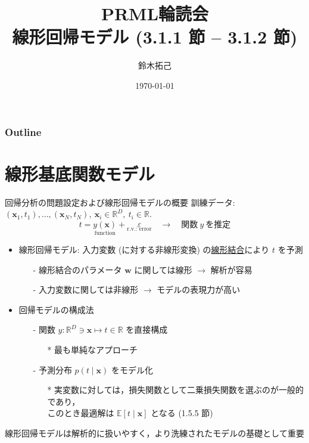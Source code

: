 \documentclass[uplatex,11pt,dvipdfmx,aspectratio=169,unicode,t]{beamer}
\title{PRML輪読会\\線形回帰モデル (3.1.1 節 -- 3.1.2 節)}
\author{鈴木拓己}
\institute{}
\date{\today}
\numberwithin{equation}{section}
\newcommand{\BE}{\mathbb{E}}
\newcommand{\BR}{\mathbb{R}}
\newcommand{\bs}[1]{\boldsymbol{#1}}
\newcommand{\1}{\bs{1}}
\newcommand{\0}{\bs{0}}
\begin{document}
\begin{frame}[plain]
    \titlepage
\end{frame}

\begin{frame}\frametitle{Outline}
    \tableofcontents
\end{frame}

\section{線形基底関数モデル}

\begin{frame}{回帰分析の問題設定および線形回帰モデルの概要}
    訓練データ: $(\bs{x}_{1}, t_{1}),\ldots,(\bs{x}_{N}, t_{N}),\ \bs{x}_{i} \in \BR^{D},\ t_{i} \in \BR.$
    \begin{equation}
        t = \underset{\text{function}}{y(\bs{x})} + \underset{\text{r.v.: error}}{\varepsilon} \quad \longrightarrow \quad \text{関数}\ y\ \text{を推定}
    \end{equation}
    \vspace{-11pt}
    \begin{itemize}
        \item 線形回帰モデル: 入力変数 (に対する非線形変換) の\underline{線形結合}により $t$ を予測
        \begin{itemize}
            \item[-] 線形結合のパラメータ $\bs{w}$ に関しては線形 $\longrightarrow$ 解析が容易
            \item[-] 入力変数に関しては非線形 $\longrightarrow$ モデルの表現力が高い
        \end{itemize}
        \item 回帰モデルの構成法
        \begin{itemize}
            \item[-] 関数 $y \colon \BR^{D} \ni \bs{x} \longmapsto t \in \BR$ を直接構成
            \begin{itemize}
                \item[*] 最も単純なアプローチ
            \end{itemize}
            \item[-] 予測分布 $p(t \mid \bs{x})$ をモデル化
            \begin{itemize}
                \item[*] 実変数に対しては，損失関数として二乗損失関数を選ぶのが一般的であり，\\このとき最適解は $\BE[t \mid \bs{x}]$ となる (1.5.5 節)
            \end{itemize}
        \end{itemize}
    \end{itemize}
    線形回帰モデルは解析的に扱いやすく，より洗練されたモデルの基礎として重要
\end{frame}
\end{document}
